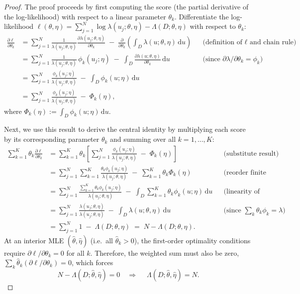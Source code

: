 \documentclass[linenum,doublespace,onecolumn]{SSA-SRL}
\theoremstyle{lemma}
\begin{document}
\begin{proof}
The proof proceeds by first computing the score (the partial derivative of the log-likelihood) with respect to a linear parameter $\theta_k$.
Differentiate the log-likelihood $\ell(\theta,\eta)=\sum_{j=1}^N \log \lambda(u_j;\theta,\eta)-\Lambda(D;\theta,\eta)$ with respect to $\theta_k$:
\begin{align*}
\frac{\partial \ell}{\partial \theta_k}
&= \sum_{j=1}^N \frac{1}{\lambda(u_j;\theta,\eta)} \frac{\partial \lambda(u_j;\theta,\eta)}{\partial \theta_k}
     \;-\; \frac{\partial}{\partial \theta_k}\!\left(\int_D \lambda(u;\theta,\eta)\, \mathrm{d}u\right)
     && \text{(definition of $\ell$ and chain rule)}\\[2pt]
&= \sum_{j=1}^N \frac{1}{\lambda(u_j;\theta,\eta)} \,\phi_k(u_j;\eta)
     \;-\; \int_D \frac{\partial \lambda(u;\theta,\eta)}{\partial \theta_k}\, \mathrm{d}u
     && \text{(since $\partial \lambda/\partial \theta_k=\phi_k$)}\\[2pt]
&= \sum_{j=1}^N \frac{\phi_k(u_j;\eta)}{\lambda(u_j;\theta,\eta)}
     \;-\; \int_D \phi_k(u;\eta)\, \mathrm{d}u\\[2pt]
&= \sum_{j=1}^N \frac{\phi_k(u_j;\eta)}{\lambda(u_j;\theta,\eta)} \;-\; \Phi_k(\eta),
\end{align*}
where $\displaystyle \Phi_k(\eta):=\int_D \phi_k(u;\eta)\, \mathrm{d}u$.

Next, we use this result to derive the central identity by multiplying each score by its corresponding parameter $\theta_k$ and summing over all $k=1,\dots,K$:
\begin{align*}
\sum_{k=1}^{K}\theta_k \frac{\partial \ell}{\partial \theta_k}
&= \sum_{k=1}^{K}\theta_k \left[
     \sum_{j=1}^{N}\frac{\phi_k(u_j;\eta)}{\lambda(u_j;\theta,\eta)} \;-\; \Phi_k(\eta)
   \right]
     && \text{(substitute result)}\\[2pt]
&= \sum_{j=1}^{N} \sum_{k=1}^{K}\frac{\theta_k \phi_k(u_j;\eta)}{\lambda(u_j;\theta,\eta)}
   \;-\; \sum_{k=1}^{K}\theta_k \Phi_k(\eta)
     && \text{(reorder finite sums)}\\[2pt]
&= \sum_{j=1}^{N} \frac{\sum_{k=1}^{K}\theta_k \phi_k(u_j;\eta)}{\lambda(u_j;\theta,\eta)}
   \;-\; \int_D \sum_{k=1}^K \theta_k \phi_k(u;\eta)\, \mathrm{d}u
     && \text{(linearity of integral)}\\[2pt]
&= \sum_{j=1}^{N} \frac{\lambda(u_j;\theta,\eta)}{\lambda(u_j;\theta,\eta)}
   \;-\; \int_D \lambda(u;\theta,\eta)\, \mathrm{d}u
     && \text{(since $\sum_k \theta_k \phi_k=\lambda$)}\\[2pt]
&= \sum_{j=1}^{N} 1 \;-\; \Lambda(D;\theta,\eta)
     \;=\; N - \Lambda(D;\theta,\eta).
\end{align*}
At an interior MLE $(\hat\theta,\hat\eta)$ (i.e.\ all $\hat\theta_k>0$), the first-order optimality conditions require $\partial \ell/\partial \theta_k=0$ for all $k$. Therefore, the weighted sum must also be zero, $\sum_k \hat\theta_k(\partial \ell/\partial \theta_k)=0$, which forces
\[
N-\Lambda(D;\hat\theta,\hat\eta)=0
\quad\Longrightarrow\quad
\boxed{\;\Lambda(D;\hat\theta,\hat\eta)=N.\;}
\]
\end{proof}
\end{document}
